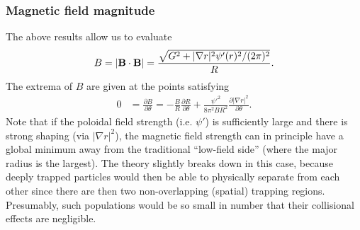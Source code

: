 \documentclass[11pt,a4paper]{article}
\renewcommand{\b}[1]{\ensuremath{ {\bf #1 } }}
\begin{document}
\subsubsection{Magnetic field magnitude}
The above results allow us to evaluate
\begin{align}
B = |\b{B}\cdot\b{B}| = \frac{\sqrt{G^2 + |\nabla r|^2 \psi'(r)^2 /(2\pi)^2}}{R}.
\end{align}
The extrema of $B$ are given at the points satisfying
\begin{align}
0 &= \frac{\partial B}{\partial \theta}  
=  - \frac{B}{R} \frac{\partial R}{\partial \theta} + \frac{\psi'^2}{8\pi^2 B R^2} \frac{\partial |\nabla r|^2}{\partial \theta}.
\end{align}
Note that if the poloidal field strength (i.e. $\psi'$) is sufficiently large and there is strong shaping (via $|\nabla r|^2$), the magnetic field strength can in principle have a global minimum away from the traditional ``low-field side'' (where the major radius is the largest). The theory slightly breaks down in this case, because deeply trapped particles would then be able to physically separate from each other since there are then two non-overlapping (spatial) trapping regions. Presumably, such populations would be so small in number that their collisional effects are negligible.
\end{document}
